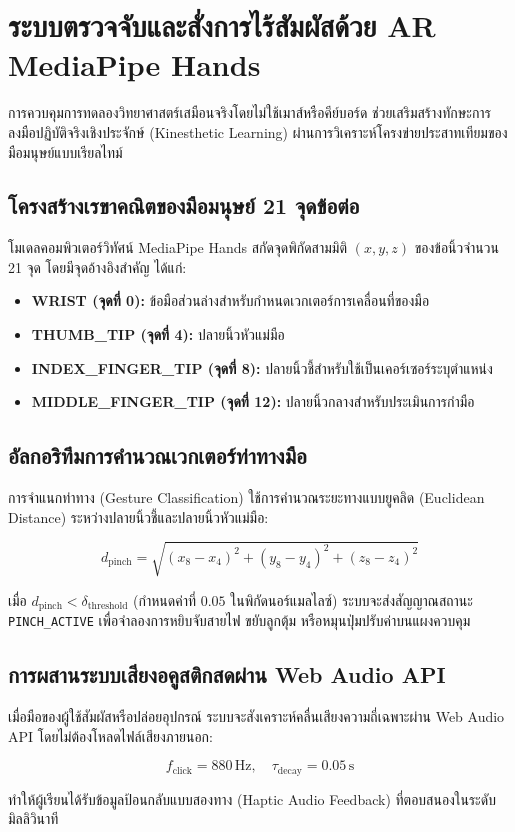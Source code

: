 \chapter{ระบบตรวจจับและสั่งการไร้สัมผัสด้วย AR MediaPipe Hands}

การควบคุมการทดลองวิทยาศาสตร์เสมือนจริงโดยไม่ใช้เมาส์หรือคีย์บอร์ด ช่วยเสริมสร้างทักษะการลงมือปฏิบัติจริงเชิงประจักษ์ (Kinesthetic Learning) ผ่านการวิเคราะห์โครงข่ายประสาทเทียมของมือมนุษย์แบบเรียลไทม์

\section{โครงสร้างเรขาคณิตของมือมนุษย์ 21 จุดข้อต่อ}

โมเดลคอมพิวเตอร์วิทัศน์ MediaPipe Hands สกัดจุดพิกัดสามมิติ $(x, y, z)$ ของข้อนิ้วจำนวน 21 จุด โดยมีจุดอ้างอิงสำคัญ ได้แก่:
\begin{itemize}
    \item \textbf{WRIST (จุดที่ 0):} ข้อมือส่วนล่างสำหรับกำหนดเวกเตอร์การเคลื่อนที่ของมือ
    \item \textbf{THUMB\_TIP (จุดที่ 4):} ปลายนิ้วหัวแม่มือ
    \item \textbf{INDEX\_FINGER\_TIP (จุดที่ 8):} ปลายนิ้วชี้สำหรับใช้เป็นเคอร์เซอร์ระบุตำแหน่ง
    \item \textbf{MIDDLE\_FINGER\_TIP (จุดที่ 12):} ปลายนิ้วกลางสำหรับประเมินการกำมือ
\end{itemize}

\section{อัลกอริทึมการคำนวณเวกเตอร์ท่าทางมือ}

การจำแนกท่าทาง (Gesture Classification) ใช้การคำนวณระยะทางแบบยูคลิด (Euclidean Distance) ระหว่างปลายนิ้วชี้และปลายนิ้วหัวแม่มือ:

\begin{equation}
d_{\text{pinch}} = \sqrt{(x_8 - x_4)^2 + (y_8 - y_4)^2 + (z_8 - z_4)^2}
\end{equation}

เมื่อ $d_{\text{pinch}} < \delta_{\text{threshold}}$ (กำหนดค่าที่ $0.05$ ในพิกัดนอร์แมลไลซ์) ระบบจะส่งสัญญาณสถานะ \texttt{PINCH\_ACTIVE} เพื่อจำลองการหยิบจับสายไฟ ขยับลูกตุ้ม หรือหมุนปุ่มปรับค่าบนแผงควบคุม

\section{การผสานระบบเสียงอคูสติกสดผ่าน Web Audio API}

เมื่อมือของผู้ใช้สัมผัสหรือปล่อยอุปกรณ์ ระบบจะสังเคราะห์คลื่นเสียงความถี่เฉพาะผ่าน Web Audio API โดยไม่ต้องโหลดไฟล์เสียงภายนอก:

\begin{equation}
f_{\text{click}} = 880\,\text{Hz}, \quad \tau_{\text{decay}} = 0.05\,\text{s}
\end{equation}

ทำให้ผู้เรียนได้รับข้อมูลป้อนกลับแบบสองทาง (Haptic Audio Feedback) ที่ตอบสนองในระดับมิลลิวินาที
